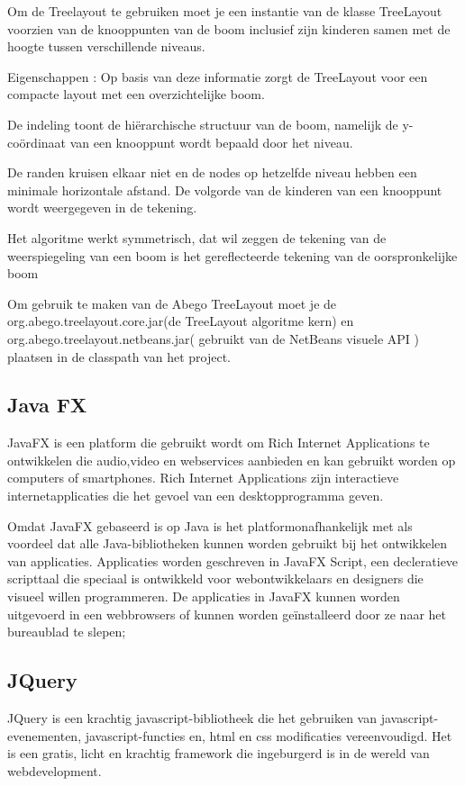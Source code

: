 \documentclass[pdftex,a4paper,12pt,twoside]{report}
\begin{document}
Om de Treelayout te gebruiken moet je een instantie van de klasse TreeLayout voorzien van de knooppunten van de boom inclusief zijn kinderen samen met de hoogte tussen verschillende niveaus.

Eigenschappen :
Op basis van deze informatie zorgt de TreeLayout voor een compacte layout met een overzichtelijke boom.

De indeling toont de hiërarchische structuur van de boom, namelijk de y-coördinaat van een knooppunt wordt bepaald door het niveau.

De randen kruisen elkaar niet en de nodes op hetzelfde niveau hebben een minimale horizontale afstand.
De volgorde van de kinderen van een knooppunt wordt weergegeven in de tekening.

Het algoritme werkt symmetrisch, dat wil zeggen de tekening van de weerspiegeling van een boom is het gereflecteerde tekening van de oorspronkelijke boom


Om gebruik te maken van de Abego TreeLayout moet je de org.abego.treelayout.core.jar(de TreeLayout algoritme kern) en org.abego.treelayout.netbeans.jar( gebruikt  van de NetBeans visuele API ) plaatsen in de classpath van het project.


\subsection{Java FX}
JavaFX is een platform die gebruikt wordt om Rich Internet Applications te ontwikkelen die audio,video en webservices aanbieden en kan gebruikt worden op computers of smartphones.
Rich Internet Applications zijn interactieve internetapplicaties die het gevoel van een desktopprogramma geven.

Omdat JavaFX gebaseerd is op Java is het platformonafhankelijk met als voordeel dat alle Java-bibliotheken kunnen worden gebruikt bij het ontwikkelen van applicaties.
Applicaties worden geschreven in JavaFX Script, een decleratieve scripttaal die speciaal is ontwikkeld voor webontwikkelaars en designers die visueel willen programmeren. 
De applicaties in JavaFX kunnen worden uitgevoerd in een webbrowsers of kunnen worden geïnstalleerd  door ze naar het bureaublad  te slepen;

\subsection{JQuery}
JQuery is een krachtig javascript-bibliotheek die het gebruiken van javascript-evenementen, javascript-functies en, html en css modificaties vereenvoudigd. Het is een gratis, licht en krachtig framework die ingeburgerd is in de wereld van webdevelopment.
\end{document}
